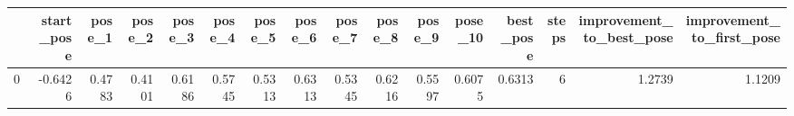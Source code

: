 \begin{tabular}{lrrrrrrrrrrrrrrr}
\toprule
{} &  start\_pose &  pose\_1 &  pose\_2 &  pose\_3 &  pose\_4 &  pose\_5 &  pose\_6 &  pose\_7 &  pose\_8 &  pose\_9 &  pose\_10 &  best\_pose &  steps &  improvement\_to\_best\_pose &  improvement\_to\_first\_pose \\
\midrule
0 &     -0.6426 &  0.4783 &  0.4101 &  0.6186 &  0.5745 &  0.5313 &  0.6313 &  0.5345 &  0.6216 &  0.5597 &   0.6075 &     0.6313 &      6 &                    1.2739 &                     1.1209 \\
\bottomrule
\end{tabular}
